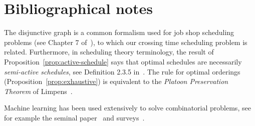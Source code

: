 \documentclass[a4paper]{article}
\theoremstyle{definition}
\theoremstyle{plain}
\begin{document}
\section*{Bibliographical notes}

The disjunctive graph is a common formalism used for job shop scheduling
problems (see Chapter 7 of~\cite{pinedoSchedulingTheoryAlgorithms2016}), to
which our crossing time scheduling problem is related. Furthermore, in
scheduling theory terminology, the result of
Proposition~\ref{prop:active-schedule} says that optimal schedules are
necessarily \textit{semi-active schedules}, see Definition 2.3.5
in~\cite{pinedoSchedulingTheoryAlgorithms2016}.
%
The rule for optimal orderings (Proposition~\ref{prop:exhaustive}) is equivalent
to the \textit{Platoon Preservation Theorem} of
Limpens~\cite{limpensOnlinePlatoonForming2023}.

Machine learning has been used extensively to solve combinatorial problems, see
for example the seminal paper~\cite{belloNeuralCombinatorialOptimization2017} and surveys~\cite{bengioMachineLearningCombinatorial2020,mazyavkinaReinforcementLearningCombinatorial2020}.



\end{document}
